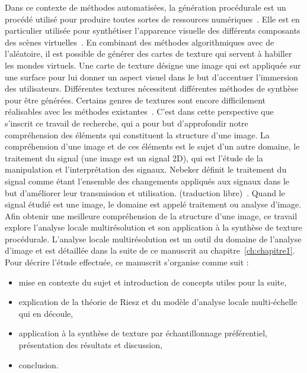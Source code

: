 Dans ce contexte de méthodes automatisées, la génération procédurale est un procédé utilisé pour produire toutes sortes de ressources numériques~\cite{smelik_survey_2014}. Elle est en particulier utilisée pour synthétiser l'apparence visuelle des différents composants des scènes virtuelles~\cite{alessio_procedural_2021}. En combinant des méthodes algorithmiques avec de l'aléatoire, il est possible de générer des cartes de texture qui servent à habiller les mondes virtuels. Une carte de texture désigne une image qui est appliquée sur une surface pour lui donner un aspect visuel dans le but d'accentuer l'immersion des utilisateurs. Différentes textures nécessitent différentes méthodes de synthèse pour être générées. Certains genres de textures sont encore difficilement réalisables avec les méthodes existantes~\cite{lutz_cyclostationary-gaussian_2021}. C'est dans cette perspective que s'inscrit ce travail de recherche, qui a pour but d'approfondir notre compréhension des éléments qui constituent la structure d'une image. La compréhension d'une image et de ces éléments est le sujet d'un autre domaine, le traitement du signal (une image est un signal 2D), qui est l'étude de la manipulation et l'interprétation des signaux. Nebeker définit le traitement du signal comme étant \og [...] l'ensemble des changements appliqués aux signaux dans le but d'améliorer leur transmission et utilisation. \fg (traduction libre)~\cite{nebeker_fifty_1998}. Quand le signal étudié est une image, le domaine est appelé traitement ou analyse d'image. Afin obtenir une meilleure compréhension de la structure d'une image, ce travail explore l'analyse locale multirésolution et son application à la synthèse de texture procédurale. L'analyse locale multirésolution est un outil du domaine de l'analyse d'image et est détaillée dans la suite de ce manuscrit au chapitre~\ref{ch:chapitre1}. Pour décrire l'étude effectuée, ce manuscrit s'organise comme suit :

\begin{itemize}
    \item mise en contexte du sujet et introduction de concepts utiles pour la suite,
    \item explication de la théorie de Riesz et du modèle d'analyse locale multi-échelle qui en découle,
    \item application à la synthèse de texture par échantillonnage préférentiel, présentation des résultats et discussion,
    \item conclusion.
\end{itemize}